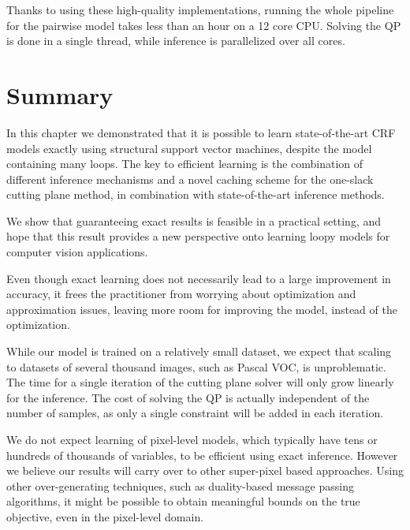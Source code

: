 Thanks to using these high-quality implementations, running the whole pipeline
for the pairwise model takes less than an hour on a 12 core CPU\@. Solving the
QP is done in a single thread, while inference is parallelized over all cores.
 
\section{Summary}
In this chapter we demonstrated that it is possible to learn state-of-the-art CRF models
exactly using structural support vector machines, despite the model containing many loops.
The key to efficient learning is the combination of different inference mechanisms and
a novel caching scheme for the one-slack cutting plane method, in combination
with state-of-the-art inference methods.

We show that guaranteeing exact results is feasible in a practical setting, and
hope that this result provides a new perspective onto learning loopy models for
computer vision applications.

Even though exact learning does not necessarily lead to a large improvement in
accuracy, it frees the practitioner from worrying about optimization and
approximation issues, leaving more room for improving the model, instead of the
optimization.

While our model is trained on a relatively small dataset, we expect that scaling to
datasets of several thousand images, such as Pascal VOC, is unproblematic.
The time for a single iteration of the cutting plane solver will only grow
linearly for the inference. The cost of solving the QP is actually independent
of the number of samples, as only a single constraint will be added in each
iteration.

We do not expect learning of pixel-level models, which typically have tens or
hundreds of thousands of variables, to be efficient using exact inference. However we
believe our results will carry over to other super-pixel based approaches.
Using other over-generating techniques, such as duality-based message passing
algorithms, it might be possible to obtain meaningful bounds on the true
objective, even in the pixel-level domain.

